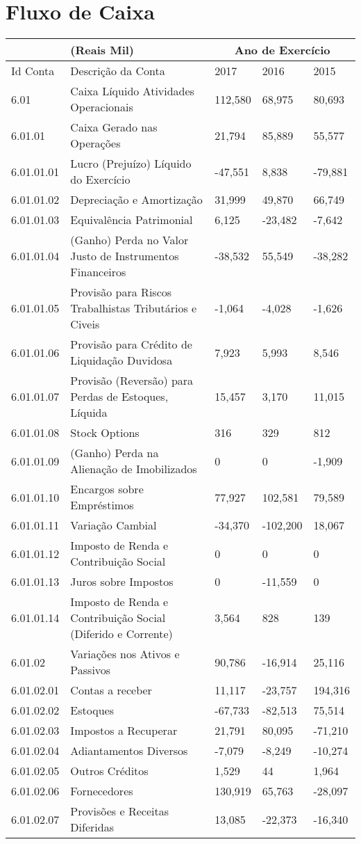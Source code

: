 \vspace*{-60pt}
\section{Fluxo de Caixa}

\begin{center}
\begin{longtable}{p{}|p{}|p{}|p{}|p{}}
\hline 
 & (Reais Mil) & \multicolumn{3}{c}{Ano de Exercício}\tabularnewline
\hline 
Id Conta & Descrição da Conta & 2017 & 2016 & 2015\tabularnewline
\hline 
6.01 & Caixa Líquido Atividades Operacionais & 112,580 & 68,975 & 80,693\tabularnewline
6.01.01 & Caixa Gerado nas Operações & 21,794 & 85,889 & 55,577\tabularnewline
6.01.01.01 & Lucro (Prejuízo) Líquido do Exercício & -47,551 & 8,838 & -79,881\tabularnewline
6.01.01.02 & Depreciação e Amortização & 31,999 & 49,870 & 66,749\tabularnewline
6.01.01.03 & Equivalência Patrimonial & 6,125 & -23,482 & -7,642\tabularnewline
6.01.01.04 & (Ganho) Perda no Valor Justo de Instrumentos Financeiros & -38,532 & 55,549 & -38,282\tabularnewline
6.01.01.05 & Provisão para Riscos Trabalhistas Tributários e Civeis & -1,064 & -4,028 & -1,626\tabularnewline
6.01.01.06 & Provisão para Crédito de Liquidação Duvidosa & 7,923 & 5,993 & 8,546\tabularnewline
6.01.01.07 & Provisão (Reversão) para Perdas de Estoques, Líquida & 15,457 & 3,170 & 11,015\tabularnewline
6.01.01.08 & Stock Options & 316 & 329 & 812\tabularnewline
6.01.01.09 & (Ganho) Perda na Alienação de Imobilizados & 0 & 0 & -1,909\tabularnewline
6.01.01.10 & Encargos sobre Empréstimos & 77,927 & 102,581 & 79,589\tabularnewline
6.01.01.11 & Variação Cambial & -34,370 & -102,200 & 18,067\tabularnewline
6.01.01.12 & Imposto de Renda e Contribuição Social & 0 & 0 & 0\tabularnewline
6.01.01.13 & Juros sobre Impostos & 0 & -11,559 & 0\tabularnewline
6.01.01.14 & Imposto de Renda e Contribuição Social (Diferido e Corrente) & 3,564 & 828 & 139\tabularnewline
6.01.02 & Variações nos Ativos e Passivos & 90,786 & -16,914 & 25,116\tabularnewline
6.01.02.01 & Contas a receber & 11,117 & -23,757 & 194,316\tabularnewline
6.01.02.02 & Estoques & -67,733 & -82,513 & 75,514\tabularnewline
6.01.02.03 & Impostos a Recuperar & 21,791 & 80,095 & -71,210\tabularnewline
6.01.02.04 & Adiantamentos Diversos & -7,079 & -8,249 & -10,274\tabularnewline
6.01.02.05 & Outros Créditos & 1,529 & 44 & 1,964\tabularnewline
6.01.02.06 & Fornecedores & 130,919 & 65,763 & -28,097\tabularnewline
6.01.02.07 & Provisões e Receitas Diferidas & 13,085 & -22,373 & -16,340\tabularnewline

\end{longtable}
\end{center}
